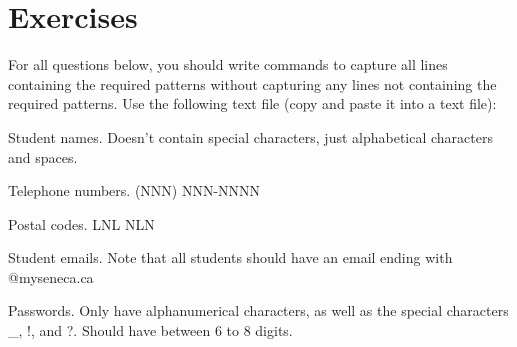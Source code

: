 \newpage

\section*{Exercises}

For all questions below, you should write  commands to capture all lines containing the required patterns without capturing any lines not containing the required patterns. Use the following  text file (copy and paste it into a text file):


\begin{exercises}
  \item Student names. Doesn't contain special characters, just alphabetical characters and spaces.
  \item Telephone numbers. (NNN) NNN-NNNN
  \item Postal codes. LNL NLN
  \item Student emails. Note that all students should have an email ending with @myseneca.ca
  \item Passwords. Only have alphanumerical characters, as well as the special characters \_, !, and ?. Should have between 6 to 8 digits.
\end{exercises}
